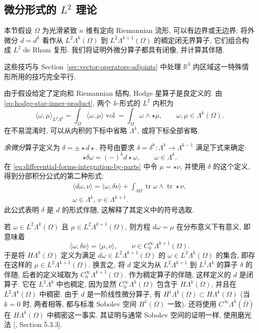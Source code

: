 \subsection{微分形式的 $L^2$ 理论}\label{subsec:differential-forms-l2-theory}

本节假设 $\Omega$ 为光滑紧致 $n$ 维有定向 Riemannian 流形, 可以有边界或无边界; 将外微分 $d=d^k$ 看作从 $L^2\Lambda^k(\Omega)$ 到 $L^2\Lambda^{k+1}(\Omega)$ 的稠定闭无界算子, 它们组合构成 $L^2$ de Rham 复形. 我们将证明外微分算子都具有闭像, 并计算其伴随.

这些技巧与 Section~\ref{sec:vector-operators-adjoints} 中处理 $\mathbb R^3$ 内区域这一特殊情形所用的技巧完全平行.

由于假设给定了定向和 Riemannian 结构, Hodge 星算子是良定义的. 由 \eqref{eq:hodge-star-inner-product}, 两个 $k$-形式的 $L^2$ 内积为
\[
\langle\omega,\mu\rangle_{L^2\Lambda^k}=\int_\Omega\langle\omega,\mu\rangle\operatorname{vol}=\int_\Omega\omega\wedge\star\mu,\qquad\omega,\mu\in\Lambda^k(\Omega).
\]
在不易混淆时, 可以从内积的下标中省略 $\Lambda^k$, 或将下标全部省略.

\emph{余微分}算子定义为 $\delta=\pm\star d\star$. 符号由要求 $\delta=\delta^k:\Lambda^k\to\Lambda^{k-1}$ 满足下式来确定:
\[
\star\delta\omega=(-)^kd\star\omega,\qquad\omega\in\Lambda^k.
\]
在 \eqref{eq:differential-forms-integration-by-parts} 中令 $\mu=\star\nu$, 并使用 $\delta$ 的这个定义, 得到分部积分公式的第二种形式:
\[
\begin{gathered}
\langle d\omega,\nu\rangle=\langle\omega,\delta\nu\rangle+\int_{\partial\Omega}\operatorname{tr}\omega\wedge\operatorname{tr}\star\nu,\\
\omega\in\Lambda^k,\ \nu\in\Lambda^{k+1}.
\end{gathered}
\]
此公式表明 $\delta$ 是 $d$ 的形式伴随, 这解释了其定义中的符号选取.

若 $\omega\in L^2\Lambda^k(\Omega)$ 且 $\mu\in L^2\Lambda^{k+1}(\Omega)$, 则方程 $d\omega=\mu$ 在分布意义下有意义, 即意味着
\[
\langle\omega,\delta\nu\rangle=\langle\mu,\nu\rangle,\qquad\nu\in C_0^\infty\Lambda^{k+1}(\Omega).
\]
于是将 $H\Lambda^k(\Omega)$ 定义为满足 $d\omega\in L^2\Lambda^{k+1}(\Omega)$ 的 $\omega\in L^2\Lambda^k(\Omega)$ 的集合, 即存在这样的 $\mu\in L^2\Lambda^{k+1}(\Omega)$. 换言之, 将 $d$ 定义为从 $L^2\Lambda^{k+1}$ 到 $L^2\Lambda^k$ 的算子 $\delta$ 的伴随, 后者的定义域取为 $C_0^\infty\Lambda^{k+1}(\Omega)$. 作为稠定算子的伴随, 这样定义的 $d$ 是闭算子. 它在 $L^2\Lambda^k$ 中也稠定, 因为显然 $C_0^\infty\Lambda^k(\Omega)$ 包含于 $H\Lambda^k(\Omega)$, 并且在 $L^2\Lambda^k(\Omega)$ 中稠密. 由于 $d$ 是一阶线性微分算子, 有 $H^1\Lambda^k(\Omega)\subset H\Lambda^k(\Omega)$ (当 $k=0$ 时, 两者相等, 都与标准 Sobolev 空间 $H^1(\Omega)$ 一致). 还将使用 $C^\infty\Lambda^k(\bar\Omega)$ 在 $H\Lambda^k(\Omega)$ 中稠密这一事实. 其证明与通常 Sobolev 空间的证明一样, 使用磨光法 [, Section 5.3.3].

